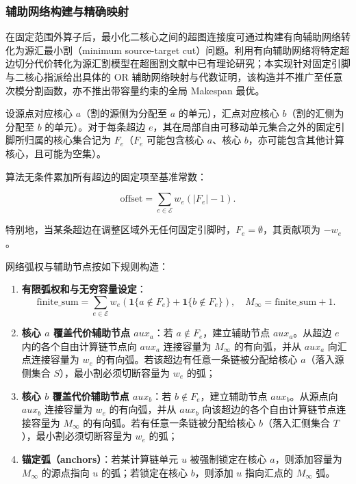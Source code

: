 \documentclass[anonymous,notoc]{gmcm2026}
\providecommand{\tightlist}{\setlength{\itemsep}{0pt}\setlength{\parskip}{0pt}}
\begin{document}
\subsubsection{辅助网络构建与精确映射}

在固定范围外算子后，最小化二核心之间的超图连接度可通过构建有向辅助网络转化为源汇最小割（minimum source-target cut）问题。利用有向辅助网络将特定超边切分代价转化为源汇割模型在超图割文献中已有理论研究\cite{ref8}；本实现针对固定引脚与二核心指派给出具体的 OR 辅助网络映射与代数证明，该构造并不推广至任意次模分割函数，亦不推出带容量约束的全局 Makespan 最优。

设源点对应核心 \(a\)（割的源侧为分配至 \(a\) 的单元），汇点对应核心 \(b\)（割的汇侧为分配至 \(b\) 的单元）。对于每条超边 \(e\)，其在局部自由可移动单元集合之外的固定引脚所归属的核心集合记为 \(F_e\)（\(F_e\) 可能包含核心 \(a\)、核心 \(b\)，亦可能包含其他计算核心，且可能为空集）。

算法无条件累加所有超边的固定项至基准常数：

\begin{equation}
\text{offset} = \sum_{e \in \mathcal{E}} w_e (|F_e| - 1).
\end{equation}

特别地，当某条超边在调整区域外无任何固定引脚时，\(F_e = \emptyset\)，其贡献项为 \(-w_e\)。

网络弧权与辅助节点按如下规则构造：

\begin{enumerate}
\def\labelenumi{\arabic{enumi}.}
\tightlist
\item
  \textbf{有限弧权和与无穷容量设定}： \begin{equation}
\text{finite\_sum} = \sum_{e \in \mathcal{E}} w_e \left( \mathbf{1}\{a \notin F_e\} + \mathbf{1}\{b \notin F_e\} \right), \quad M_\infty = \text{finite\_sum} + 1.
\end{equation}
\item
  \textbf{核心 \(a\) 覆盖代价辅助节点 \(aux_a\)}：若 \(a \notin F_e\)，建立辅助节点 \(aux_a\)。从超边 \(e\) 内的各个自由计算链节点向 \(aux_a\) 连接容量为 \(M_\infty\) 的有向弧，并从 \(aux_a\) 向汇点连接容量为 \(w_e\) 的有向弧。若该超边有任意一条链被分配给核心 \(a\)（落入源侧集合 \(S\)），最小割必须切断容量为 \(w_e\) 的弧；
\item
  \textbf{核心 \(b\) 覆盖代价辅助节点 \(aux_b\)}：若 \(b \notin F_e\)，建立辅助节点 \(aux_b\)。从源点向 \(aux_b\) 连接容量为 \(w_e\) 的有向弧，并从 \(aux_b\) 向该超边的各个自由计算链节点连接容量为 \(M_\infty\) 的有向弧。若有任意一条链被分配给核心 \(b\)（落入汇侧集合 \(T\)），最小割必须切断容量为 \(w_e\) 的弧；
\item
  \textbf{锚定弧（anchors）}：若某计算链单元 \(u\) 被强制锁定在核心 \(a\)，则添加容量为 \(M_\infty\) 的源点指向 \(u\) 的弧；若锁定在核心 \(b\)，则添加 \(u\) 指向汇点的 \(M_\infty\) 弧。
\end{enumerate}
\end{document}

